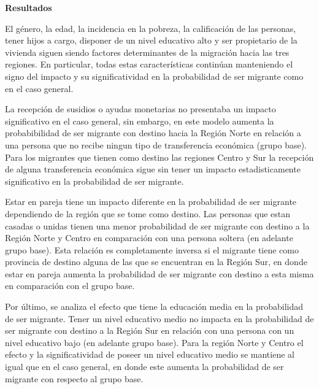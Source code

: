 \documentclass[12pt,a4paper]{article}
\begin{document}
\textbf{Resultados}

El género, la edad, la incidencia en la pobreza, la calificación de las personas, tener hijos a cargo, disponer de un nivel educativo alto y ser propietario de la vivienda siguen siendo factores determinantes de la migración hacia las tres regiones. En particular, todas estas características continúan  manteniendo el signo del impacto y su significatividad en la probabilidad de ser migrante como en el caso general. 

La recepción de susidios o ayudas monetarias no presentaba un impacto significativo en el caso general, sin embargo, en este modelo aumenta la probabibilidad de ser migrante con destino hacia la Región Norte en relación a una persona que no recibe ningun tipo de transferencia económica (grupo base). Para los migrantes que tienen como destino las regiones Centro y Sur la recepción de alguna transferencia económica  sigue sin tener un impacto estadisticamente significativo en la probabilidad de ser migrante.

Estar en pareja tiene un impacto diferente en la probabilidad de ser migrante dependiendo de la región que se tome como destino. Las personas que estan casadas o unidas tienen una menor probabilidad de ser migrante con destino a la Región Norte y Centro en comparación con una persona soltera (en adelante grupo base). Esta relación es completamente inversa si el migrante tiene como provincia de destino alguna de las que se encuentran en la Región Sur, en donde estar en pareja aumenta la probabilidad de ser migrante con destino a esta misma en comparación con el grupo base.


Por último, se analiza el efecto que tiene la educación media en la probabilidad de ser migrante. Tener un nivel educativo medio no impacta en la probabilidad de ser migrante con destino a la Región Sur en relación con una persona con un nivel educativo bajo (en adelante grupo base). Para la región Norte y Centro el efecto y la significatividad de poseer un nivel educativo medio se mantiene al igual que en el caso general, en donde este aumenta la probabilidad de ser migrante con respecto al grupo base.
\end{document}
